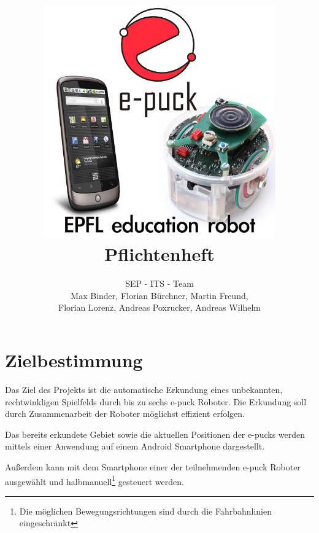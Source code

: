 \documentclass[10pt,a4paper]{article}
\title{
	\includegraphics[width=10cm]{logo.png} \\
	\vspace{1cm}
	Pflichtenheft
}
\author{SEP - ITS - Team \\ Max Binder, Florian Bürchner, Martin Freund, \\Florian Lorenz,
											Andreas Poxrucker, Andreas Wilhelm}
\let\oldsection\section
\renewcommand{\section}{\newpage \oldsection}
\begin{document}
	\maketitle
	\newpage
	\tableofcontents	
	\newpage
	
	\section{Zielbestimmung}
		Das Ziel des Projekts ist die automatische Erkundung eines unbekannten, rechtwinkligen Spielfelds durch bis zu
		sechs e-puck Roboter. Die Erkundung soll durch Zusammenarbeit der Roboter möglichst effizient erfolgen.
		
		Das bereits erkundete Gebiet sowie die aktuellen Positionen der e-pucks werden mittels einer Anwendung auf einem Android
		Smartphone dargestellt.	
		
		Außerdem kann mit dem Smartphone einer der teilnehmenden e-puck Roboter ausgewählt und halbmanuell\footnote{Die
			möglichen Bewegungsrichtungen sind durch die Fahrbahnlinien eingeschränkt}  gesteuert werden.
\end{document}
